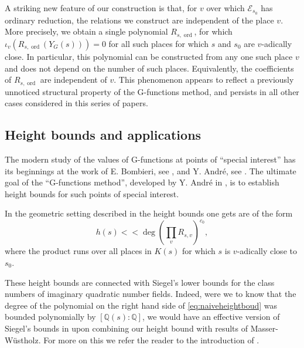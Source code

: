 \documentclass[12pt,twoside,a4paper]{article}
\theoremstyle{plain}%
\DeclareMathOperator{\ord}{ord}
\newcommand{\Q}{\mathbb{Q}}
\newcommand{\CE}{\mathcal{E}}
\begin{document}
A striking new feature of our construction is that, for $v$ over which $\CE_{s_0}$ has ordinary reduction, the relations we construct are independent of the place $v$. More precisely, we obtain a single polynomial $R_{s,\ord}$, for which $\iota_v(R_{s,\ord}(Y_G(s)))=0$ for all such places for which $s$ and $s_0$ are $v$-adically close. In particular, this polynomial can be constructed from any one such place $v$ and does not depend on the number of such places. Equivalently, the coefficients of $R_{s,\ord}$ are independent of $v$. This phenomenon appears to reflect a previously unnoticed structural property of the G-functions method, and persists in all other cases considered in this series of papers.

\subsection{Height bounds and applications}\label{section:heightboundsintro}

The modern study of the values of G-functions at points of ``special interest'' has its beginnings at the work of E. Bombieri, see \cite{bombg}, and Y. Andr\'e, see \cite{andre1989g}. The ultimate goal of the ``G-functions method'', developed by Y. Andr\'e in \cite{andre1989g}, is to establish height bounds for such points of special interest.

In the geometric setting described in  the height bounds one gets are of the form \begin{equation}\label{eq:naiveheightboud}
	h(s)<< \deg(\prod_{v}^{} R_{s,v})^{c_0},
\end{equation}where the product runs over all places in $K(s)$ for which $s$ is $v$-adically close to $s_0$. 

These height bounds are connected with Siegel's lower bounds for the class numbers of imaginary quadratic number fields. Indeed, were we to know that the degree of the polynomial on the right hand side of \eqref{eq:naiveheightboud} was bounded polynomially by $[\Q(s):\Q]$, we would have an effective version of Siegel's bounds in \cite{siegelog} upon combining our height bound with results of Masser-W\"ustholz. For more on this we refer the reader to the introduction of \cite{papaseffbrsieg}.
\end{document}
